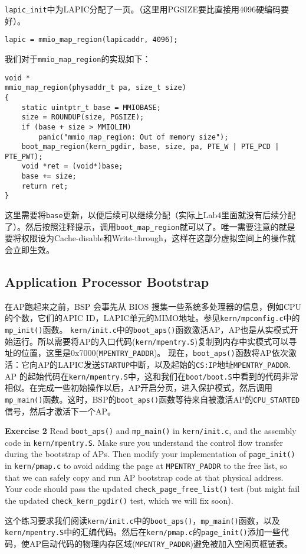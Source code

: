 \documentclass[11pt]{article}
\begin{document}
\lstinline|lapic_init|中为LAPIC分配了一页。（这里用PGSIZE要比直接用4096硬编码要好）。
\begin{lstlisting}[title=kern/lapic.c]
	lapic = mmio_map_region(lapicaddr, 4096);
\end{lstlisting}

我们对于\lstinline|mmio_map_region|的实现如下：
\begin{lstlisting}[title=kern/pmap.c]
void *
mmio_map_region(physaddr_t pa, size_t size)
{
	static uintptr_t base = MMIOBASE;
	size = ROUNDUP(size, PGSIZE);
	if (base + size > MMIOLIM)
		panic("mmio_map_region: Out of memory size");
	boot_map_region(kern_pgdir, base, size, pa, PTE_W | PTE_PCD | PTE_PWT);
	void *ret = (void*)base;
	base += size;
	return ret;
}
\end{lstlisting}
这里需要将\lstinline|base|更新，以便后续可以继续分配（实际上Lab4里面就没有后续分配了）。然后按照注释提示，调用\lstinline|boot_map_region|就可以了。唯一需要注意的就是要将权限设为Cache-disable和Write-through，这样在这部分虚拟空间上的操作就会立即生效。

\subsection{Application Processor Bootstrap}
在AP跑起来之前，BSP 会事先从 BIOS 搜集一些系统多处理器的信息，例如CPU的个数，它们的APIC ID，LAPIC单元的MIMO地址。参见\lstinline|kern/mpconfig.c|中的\lstinline|mp_init()|函数。 
\lstinline|kern/init.c|中的\lstinline|boot_aps()|函数激活AP，AP也是从实模式开始运行。所以需要将AP的入口代码(\lstinline|kern/mpentry.S|)复制到内存中实模式可以寻址的位置，这里是0x7000(\lstinline|MPENTRY_PADDR|)。
现在，\lstinline|boot_aps()|函数将AP依次激活：它向AP的LAPIC发送\lstinline|STARTUP|中断，以及起始的\lstinline|CS:IP|地址\lstinline|MPENTRY_PADDR|. AP 的起始代码在\lstinline|kern/mpentry.S|中，这和我们在\lstinline|boot/boot.S|中看到的代码非常相似。在完成一些初始操作以后，AP开启分页，进入保护模式，然后调用\lstinline|mp_main()|函数。这时，BSP的\lstinline|boot_aps()|函数等待来自被激活AP的\lstinline|CPU_STARTED|信号，然后才激活下一个AP。 

\begin{framed}
\noindent\textbf{Exercise 2} Read \lstinline|boot_aps()| and \lstinline|mp_main()| in \lstinline|kern/init.c|, and the assembly code in \lstinline|kern/mpentry.S|. Make sure you understand the control flow transfer during the bootstrap of APs. Then modify your implementation of \lstinline|page_init()| in \lstinline|kern/pmap.c| to avoid adding the page at \lstinline|MPENTRY_PADDR| to the free list, so that we can safely copy and run AP bootstrap code at that physical address. Your code should pass the updated \lstinline|check_page_free_list()| test (but might fail the updated \lstinline|check_kern_pgdir()| test, which we will fix soon).
\end{framed}
这个练习要求我们阅读\lstinline|kern/init.c|中的\lstinline|boot_aps()|，\lstinline|mp_main()|函数，以及\lstinline|kern/mpentry.S|中的汇编代码。然后在\lstinline|kern/pmap.c|的\lstinline|page_init()|添加一些代码，使AP启动代码的物理内存区域(\lstinline|MPENTRY_PADDR|)避免被加入空闲页框链表。
\end{document}
